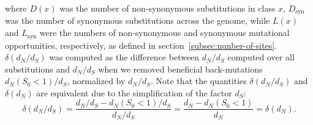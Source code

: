 \documentclass[12pt]{article}
\newcommand{\dn}{d_N}
\newcommand{\ds}{d_S}
\newcommand{\dnds}{\dn / \ds}
\newcommand{\Sphy}{S_{0}}
\newcommand{\Sphyclass}{x}
\begin{document}
    where $D \left( \Sphyclass \right) $ was the number of non-synonymous substitutions in class $\Sphyclass$, $D_{\text{syn}}$ was the number of synonymous substitutions across the genome, while $L \left( \Sphyclass \right)$ and $L_{\text{syn}}$ were the numbers of non-synonymous and synonymous mutational opportunities, respectively, as defined in section~\ref{subsec:nunber-of-sites}.
    $\delta(\dnds)$ was computed as the difference between $\dnds$ computed over all substitutions and $\dnds$ when we removed beneficial back-mutations $\dn (\Sphy < 1) / \ds$, normalized by $\dnds$.
    Note that the quantities $\delta(\dnds)$ and $\delta(\dn)$ are equivalent due to the simplification of the factor $\ds$:
    \begin{equation}
        \delta(\dnds) = \dfrac{\dnds - \dn(\Sphy < 1) / \ds}{\dnds} = \dfrac{\dn - \dn(\Sphy < 1)}{\dn} = \delta(\dn).\label{eq:delta-dnds}
    \end{equation}
\end{document}
